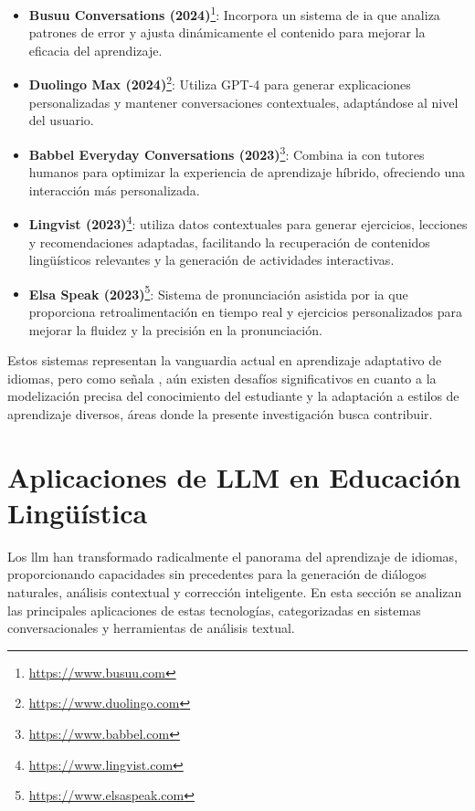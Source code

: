 \begin{itemize}
  \item \textbf{Busuu Conversations (2024)}\footnote{\url{https://www.busuu.com}}: Incorpora un sistema de \gls{ia} que analiza patrones de error y ajusta dinámicamente el contenido para mejorar la eficacia del aprendizaje.
  \item \textbf{Duolingo Max (2024)}\footnote{\url{https://www.duolingo.com}}: Utiliza GPT-4 para generar explicaciones personalizadas y mantener conversaciones contextuales, adaptándose al nivel del usuario.
  \item \textbf{Babbel Everyday Conversations (2023)}\footnote{\url{https://www.babbel.com}}: Combina \gls{ia} con tutores humanos para optimizar la experiencia de aprendizaje híbrido, ofreciendo una interacción más personalizada.
  \item \textbf{Lingvist (2023)}\footnote{\url{https://www.lingvist.com}}: utiliza datos contextuales para generar ejercicios, lecciones y recomendaciones adaptadas, facilitando la recuperación de contenidos lingüísticos relevantes y la generación de actividades interactivas.
  \item \textbf{Elsa Speak (2023)}\footnote{\url{https://www.elsaspeak.com}}: Sistema de pronunciación asistida por \gls{ia} que proporciona retroalimentación en tiempo real y ejercicios personalizados para mejorar la fluidez y la precisión en la pronunciación.
\end{itemize}

Estos sistemas representan la vanguardia actual en aprendizaje adaptativo de idiomas, pero como señala \cite{vanlehn2011relative}, aún existen desafíos significativos en cuanto a la modelización precisa del conocimiento del estudiante y la adaptación a estilos de aprendizaje diversos, áreas donde la presente investigación busca contribuir.

\section{Aplicaciones de LLM en Educación Lingüística}
\label{sec:aplicaciones-llm}

Los \gls{llm} han transformado radicalmente el panorama del aprendizaje de idiomas, proporcionando capacidades sin precedentes para la generación de diálogos naturales, análisis contextual y corrección inteligente. En esta sección se analizan las principales aplicaciones de estas tecnologías, categorizadas en sistemas conversacionales y herramientas de análisis textual.


